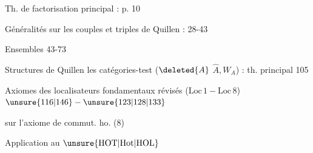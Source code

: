Th. de factorisation principal : p. 10

Généralités sur les couples et triples de Quillen : 28-43

Ensembles  \hfill 43-73

Structures de Quillen  les catégories-test ($\deleted{A}$ $\widehat A,W_A$) : th. principal \hfill 105

Axiomes des localisateurs fondamentaux révisés ($\mathrm{Loc}\,1-\mathrm{Loc}\,8$) \hfill $\unsure{116|146}-\unsure{123|128|133}$ 

 sur l'axiome de commut. ho. (8)
\margin{$\vert$}

Application au  $\unsure{\mathrm{HOT}|\mathrm{Hot}|\mathrm{HOL}}$
